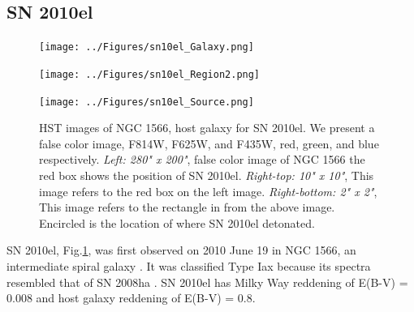 \documentclass[preprint]{aastex}
\begin{document}
\subsection{SN 2010el}
	\begin{figure}
	\begin{minipage}[c][7cm]{.6\textwidth}
		\vspace*{\fill}
		\hspace*{-1.5cm}\texttt{[image: ../Figures/sn10el\_Galaxy.png]}
			\label{fig:10elgal}
	\end{minipage}
	\begin{minipage}[c][7cm]{.5\textwidth}
		\hspace*{-.3cm}\texttt{[image: ../Figures/sn10el\_Region2.png]}
			\label{fig:r10el}\par
		\hspace*{-.3cm}\texttt{[image: ../Figures/sn10el\_Source.png]}
			\label{fig:s10el}
	\end{minipage}
	\newline\caption{HST images of NGC 1566, host galaxy for SN 2010el. We present a false color image,
	 F814W, F625W, and F435W, red, green, and blue respectively. \textit{Left: 280" x 200"}, false color image of 
	NGC 1566 the red box shows the position of SN 2010el. \textit{Right-top: 10" x 10"}, This image refers to the red 
	box on the left image. \textit{Right-bottom: 2" x 2"}, This image refers to the rectangle in from the above image. 
	Encircled is the location of where SN 2010el detonated.}
	\label{fig:10el_whole}
	\end{figure}
SN 2010el, Fig.\ref{fig:10el_whole}, was first observed on 2010 June 19 in NGC 1566, 
an intermediate spiral galaxy \citep{mon10}. 
It was classified Type Iax because its
spectra resembled that of SN 2008ha \citep{bes10}.
SN 2010el has Milky Way reddening of E(B-V) = 0.008 and host galaxy reddening of 
E(B-V) = 0.8. 



\end{document}
